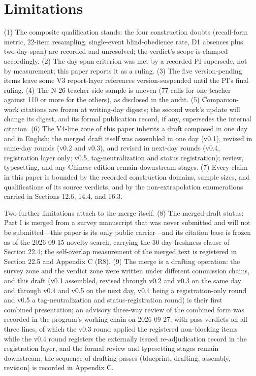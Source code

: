 \documentclass[11pt]{article}
\begin{document}
\section{Limitations}
\label{sec:21}
\noindent (1) The composite qualification stands: the four construction doubts (recall-form metric, 22-item resampling, single-event blind-obedience rate, D1 absences plus two-day span) are recorded and unresolved; the verdict's scope is clamped accordingly. (2) The day-span criterion was met by a recorded PI supersede, not by measurement; this paper reports it as a ruling. (3) The five version-pending items leave some V3 report-layer references version-suspended until the PI's final ruling. (4) The N-26 teacher-side sample is uneven (77 calls for one teacher against 110 or more for the others), as disclosed in the audit. (5) Companion-work citations are frozen at writing-day digests; the second work's update will change its digest, and its formal publication record, if any, supersedes the internal citation. (6) The V4-line zone of this paper inherits a draft composed in one day and in English; the merged draft itself was assembled in one day (v0.1), revised in same-day rounds (v0.2 and v0.3), and revised in next-day rounds (v0.4, registration layer only; v0.5, tag-neutralization and status registration); review, typesetting, and any Chinese edition remain downstream stages. (7) Every claim in this paper is bounded by the recorded construction domains, sample sizes, and qualifications of its source verdicts, and by the non-extrapolation enumerations carried in Sections 12.6, 14.4, and 16.3.\par
\noindent Two further limitations attach to the merge itself. (8) The merged-draft status: Part I is merged from a survey manuscript that was never submitted and will not be submitted—this paper is its only public carrier—and its citation base is frozen as of the 2026-09-15 novelty search, carrying the 30-day freshness clause of Section 22.4; the self-overlap measurement of the merged text is registered in Section 22.5 and Appendix C (R8). (9) The merge is a drafting operation: the survey zone and the verdict zone were written under different commission chains, and this draft (v0.1 assembled, revised through v0.2 and v0.3 on the same day and through v0.4 and v0.5 on the next day, v0.4 being a registration-only round and v0.5 a tag-neutralization and status-registration round) is their first combined presentation; an advisory three-way review of the combined form was recorded in the program's working chain on 2026-09-27, with pass verdicts on all three lines, of which the v0.3 round applied the registered non-blocking items while the v0.4 round registers the externally issued re-adjudication record in the registration layer, and the formal review and typesetting stages remain downstream; the sequence of drafting passes (blueprint, drafting, assembly, revision) is recorded in Appendix C.\par
\end{document}
